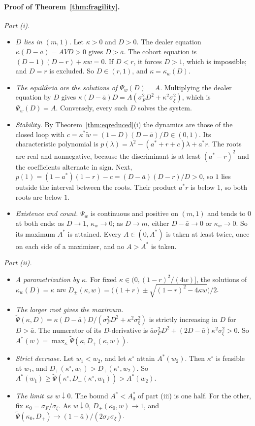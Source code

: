 \paragraph{Proof of Theorem~\ref{thm:fragility}.}
\emph{Part (i).}
\begin{itemize}[itemsep=1pt,topsep=2pt]
\item \emph{$D$ lies in $(m,1)$.} Let $\kappa>0$ and $D>0$. The dealer equation $\kappa(D-\bar a)=AVD>0$ gives $D>\bar a$. The cohort equation is $(D-1)(D-r)+\kappa w=0$. If $D<r$, it forces $D>1$, which is impossible; and $D=r$ is excluded. So $D\in(r,1)$, and $\kappa=\kappa_w(D)$.
\item \emph{The equilibria are the solutions of $\Psi_w(D)=A$.} Multiplying the dealer equation by $D$ gives $\kappa(D-\bar a)D=A(\sigma_F^2D^2+\kappa^2\sigma_\xi^2)$, which is $\Psi_w(D)=A$. Conversely, every such $D$ solves the system.
\item \emph{Stability.} By Theorem~\ref{thm:eqreduced}(i) the dynamics are those of the closed loop with $c=\kappa^*\tilde w=(1-D)(D-\bar a)/D\in(0,1)$. Its characteristic polynomial is $p(\lambda)=\lambda^2-(a^*+r+c)\lambda+a^*r$. The roots are real and nonnegative, because the discriminant is at least $(a^*-r)^2$ and the coefficients alternate in sign. Next, $p(1)=(1-a^*)(1-r)-c=(D-\bar a)(D-r)/D>0$, so $1$ lies outside the interval between the roots. Their product $a^*r$ is below $1$, so both roots are below $1$.
\item \emph{Existence and count.} $\Psi_w$ is continuous and positive on $(m,1)$ and tends to $0$ at both ends: as $D\to1$, $\kappa_w\to0$; as $D\to m$, either $D-\bar a\to0$ or $\kappa_w\to0$. So its maximum $A^*$ is attained. Every $A\in(0,A^*)$ is taken at least twice, once on each side of a maximizer, and no $A>A^*$ is taken.
\end{itemize}

\emph{Part (ii).}
\begin{itemize}[itemsep=1pt,topsep=2pt]
\item \emph{A parametrization by $\kappa$.} For fixed $\kappa\in(0,(1-r)^2/(4w)]$, the solutions of $\kappa_w(D)=\kappa$ are $D_\pm(\kappa,w)=\bigl((1+r)\pm\sqrt{(1-r)^2-4\kappa w}\bigr)/2$.
\item \emph{The larger root gives the maximum.} $\tilde\Psi(\kappa,D)=\kappa(D-\bar a)D/(\sigma_F^2D^2+\kappa^2\sigma_\xi^2)$ is strictly increasing in $D$ for $D>\bar a$. The numerator of its $D$-derivative is $\bar a\sigma_F^2D^2+(2D-\bar a)\kappa^2\sigma_\xi^2>0$. So $A^*(w)=\max_\kappa\tilde\Psi(\kappa,D_+(\kappa,w))$.
\item \emph{Strict decrease.} Let $w_1<w_2$, and let $\kappa^\circ$ attain $A^*(w_2)$. Then $\kappa^\circ$ is feasible at $w_1$, and $D_+(\kappa^\circ,w_1)>D_+(\kappa^\circ,w_2)$. So $A^*(w_1)\ge\tilde\Psi(\kappa^\circ,D_+(\kappa^\circ,w_1))>A^*(w_2)$.
\item \emph{The limit as $w\downarrow0$.} The bound $A^*<A^*_0$ of part (iii) is one half. For the other, fix $\kappa_0=\sigma_F/\sigma_\xi$. As $w\downarrow0$, $D_+(\kappa_0,w)\to1$, and $\tilde\Psi(\kappa_0,D_+)\to(1-\bar a)/(2\sigma_F\sigma_\xi)$.
\end{itemize}

